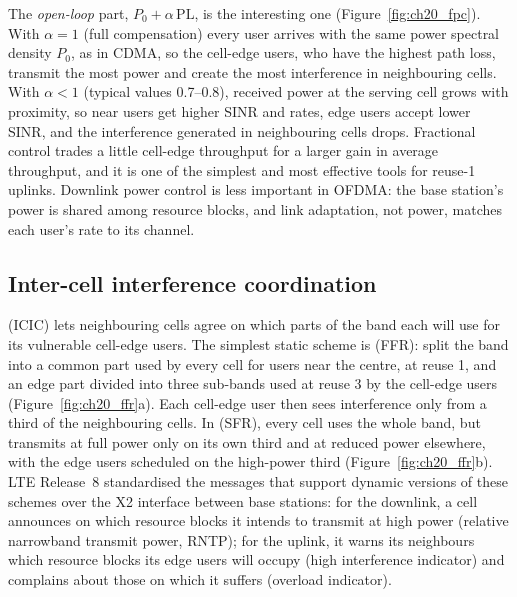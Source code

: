 The \emph{open-loop} part, $P_0+\alpha\,\mathrm{PL}$, is the interesting one (Figure~\ref{fig:ch20_fpc}). With
$\alpha=1$ (full compensation) every user arrives with the same power spectral density $P_0$, as in CDMA, so the
cell-edge users, who have the highest path loss, transmit the most power and create the most interference in
neighbouring cells. With $\alpha<1$ (typical values 0.7--0.8), received power at the serving cell grows with
proximity, so near users get higher SINR and rates, edge users accept lower SINR, and the interference generated in
neighbouring cells drops. Fractional control trades a little cell-edge throughput for a larger gain in average
throughput, and it is one of the simplest and most effective tools for reuse-1 uplinks. Downlink power control is less
important in OFDMA: the base station's power is shared among resource blocks, and link adaptation, not power,
matches each user's rate to its channel.


\subsection{Inter-cell interference coordination}

 (ICIC) lets neighbouring cells agree on which parts of the band each
will use for its vulnerable cell-edge users. The simplest static scheme is  (FFR):
split the band into a common part used by every cell for users near the centre, at reuse 1, and an edge part
divided into three sub-bands used at reuse 3 by the cell-edge users (Figure~\ref{fig:ch20_ffr}a). Each cell-edge
user then sees interference only from a third of the neighbouring cells. In  (SFR), every
cell uses the whole band, but transmits at full power only on its own third and at reduced power elsewhere, with
the edge users scheduled on the high-power third (Figure~\ref{fig:ch20_ffr}b). LTE Release~8 standardised the
messages that support dynamic versions of these schemes over the X2 interface between base stations: for the
downlink, a cell announces on which resource blocks it intends to transmit at high power (relative narrowband
transmit power, RNTP); for the uplink, it warns its neighbours which resource blocks its edge users will occupy
(high interference indicator) and complains about those on which it suffers (overload indicator).

